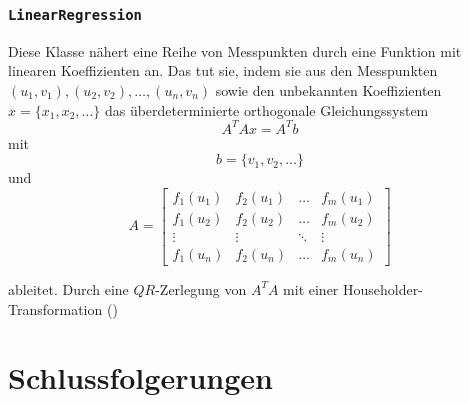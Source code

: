 \documentclass[11pt]{scrreprt} %
\theoremstyle{definition}
\begin{document}
\subsection{{\tt LinearRegression}}

Diese Klasse nähert eine Reihe von Messpunkten durch eine Funktion mit linearen Koeffizienten an. Das tut sie, indem sie aus den Messpunkten $(u_1, v_1), (u_2, v_2), \dots, (u_n, v_n)$ sowie den unbekannten Koeffizienten $x = \{x_1, x_2, \dots\}$ das überdeterminierte orthogonale Gleichungssystem
\[
A^TAx = A^Tb
\]
mit
\[
b = \{v_1, v_2, \dots\}
\] und \[
A = \begin{bmatrix}
f_{1}(u_1) & f_{2}(u_1) & \dots & f_m(u_1) \\
f_1(u_2) & f_2(u_2) & \dots & f_m(u_2) \\
\vdots & \vdots & \ddots & \vdots \\
f_1(u_n) & f_2(u_n) & \dots & f_m(u_n)
\end{bmatrix}
\]

ableitet. Durch eine $QR$-Zerlegung von $A^TA$ mit einer Householder-Transformation (\cite{wiki:householder})

\chapter{Schlussfolgerungen}



\end{document}
